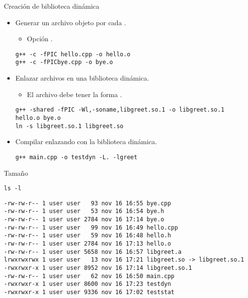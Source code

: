 \begin{frame}[t,fragile]{Creación de biblioteca dinámica}
\begin{itemize}
  \item Generar un archivo objeto por cada .
    \begin{itemize}
      \item Opción .
    \end{itemize}
\begin{lstlisting}[style=terminal]
g++ -c -fPIC hello.cpp -o hello.o
g++ -c -fPICbye.cpp -o bye.o
\end{lstlisting}
  \item Enlazar archivos en una biblioteca dinámica.
    \begin{itemize}
      \item El archivo debe tener la forma .
    \end{itemize}
\begin{lstlisting}[style=terminal,basicstyle=\tiny\ttfamily]
g++ -shared -fPIC -Wl,-soname,libgreet.so.1 -o libgreet.so.1 hello.o bye.o
ln -s libgreet.so.1 libgreet.so
\end{lstlisting}
  \item Compilar enlazando con la biblioteca dinámica. 
\begin{lstlisting}[style=terminal]
g++ main.cpp -o testdyn -L. -lgreet
\end{lstlisting}
\end{itemize}
\end{frame}

\begin{frame}[t,fragile]{Tamaño}
\begin{lstlisting}[style=terminal,basicstyle=\tiny\ttfamily]
ls -l
\end{lstlisting}
\begin{lstlisting}[style=terminal,basicstyle=\tiny\ttfamily]
-rw-rw-r-- 1 user user   93 nov 16 16:55 bye.cpp
-rw-rw-r-- 1 user user   53 nov 16 16:54 bye.h
-rw-rw-r-- 1 user user 2784 nov 16 17:14 bye.o
-rw-rw-r-- 1 user user   99 nov 16 16:49 hello.cpp
-rw-rw-r-- 1 user user   59 nov 16 16:48 hello.h
-rw-rw-r-- 1 user user 2784 nov 16 17:13 hello.o
-rw-rw-r-- 1 user user 5658 nov 16 16:57 libgreet.a
lrwxrwxrwx 1 user user   13 nov 16 17:21 libgreet.so -> libgreet.so.1
-rwxrwxr-x 1 user user 8952 nov 16 17:14 libgreet.so.1
-rw-rw-r-- 1 user user   62 nov 16 16:50 main.cpp
-rwxrwxr-x 1 user user 8600 nov 16 17:23 testdyn
-rwxrwxr-x 1 user user 9336 nov 16 17:02 teststat
\end{lstlisting}
\end{frame}

